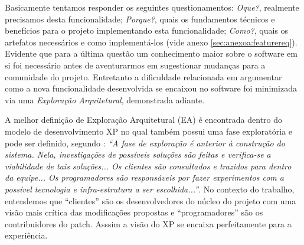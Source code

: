 Basicamente tentamos responder os seguintes questionamentos: \textit{Oque?}, realmente precisamos desta funcionalidade; \textit{Porque?}, quais os fundamentos técnicos e benefícios para o projeto implementando esta funcionalidade; \textit{Como?}, quais os artefatos necessários e como implementá-los (vide anexo \ref{sec:anexoa:featurereq}). Evidente que para a última questão um conhecimento maior sobre o software em si foi necessário antes de aventurarmos em sugestionar mudanças para a comunidade do projeto. Entretanto a dificuldade relacionada em argumentar como a nova funcionalidade desenvolvida se encaixou no software foi minimizada via uma \textit{Exploração Arquitetural}, demonstrada adiante.

A melhor definição de Exploração Arquitetural (EA) é encontrada dentro do modelo de desenvolvimento XP no qual também possui uma fase exploratória e pode ser definido, segundo \cite[página 36]{procdesenv}: \textit{``A fase de exploração é anterior à construção do sistema. Nela, investigações de possíveis soluções são feitas e verifica-se a viabilidade de tais soluções... Os clientes são consultados e trazidos para dentro da equipe... Os programadores são responsáveis por fazer experimentos com a possível tecnologia e infra-estrutura a ser escolhida...''}. No contexto do trabalho, entendemos que ``clientes'' são os desenvolvedores do núcleo do projeto com uma visão mais crítica das modificações propostas e ``programadores'' são os contribuidores do patch. Asssim a visão do XP se encaixa perfeitamente para a experiência.


